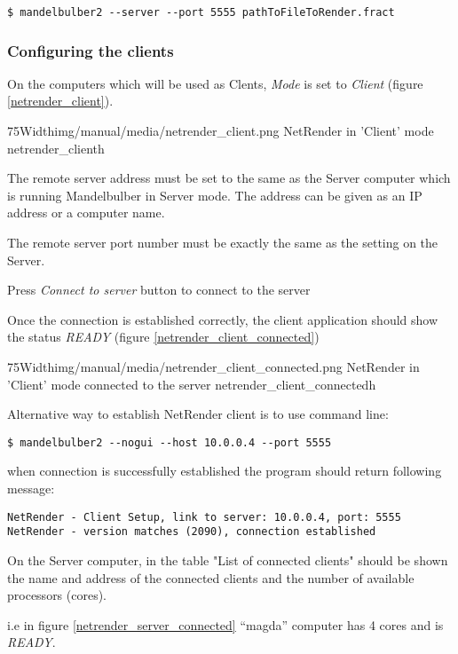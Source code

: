 \begin{verbatim} 
$ mandelbulber2 --server --port 5555 pathToFileToRender.fract
\end{verbatim}

\subsubsection{Configuring the clients}\label{configuring-the-clients}

On the computers which will be used as Clents, \emph{Mode} is set to
\emph{Client} (figure \ref{netrender_client}).

\simpleImageWithCaption75Width{img/manual/media/netrender_client.png}
{NetRender in 'Client' mode}
{netrender_client}{h}

The remote server address must be set to the same as the Server computer which
is running Mandelbulber in Server mode. The address can be given as an IP
address or a computer name.

The remote server port number must be exactly the same as the setting on the
Server.

Press \emph{Connect to server} button to connect to the server

Once the connection is established correctly, the client application should show
the status \emph{READY} (figure \ref{netrender_client_connected})

\simpleImageWithCaption75Width{img/manual/media/netrender_client_connected.png}
{NetRender in 'Client' mode connected to the server}
{netrender_client_connected}{h}

Alternative way to establish NetRender client is to use command line:

\begin{verbatim} 
$ mandelbulber2 --nogui --host 10.0.0.4 --port 5555
\end{verbatim}

when connection is successfully established the program should return following
message:

\begin{verbatim} 
NetRender - Client Setup, link to server: 10.0.0.4, port: 5555
NetRender - version matches (2090), connection established 
\end{verbatim}

On the Server computer, in the table "List of connected clients" should be shown
the name and address of the connected clients and the number of available
processors (cores).

i.e in figure \ref{netrender_server_connected} ``magda'' computer has 4 cores and is \emph{READY}.

